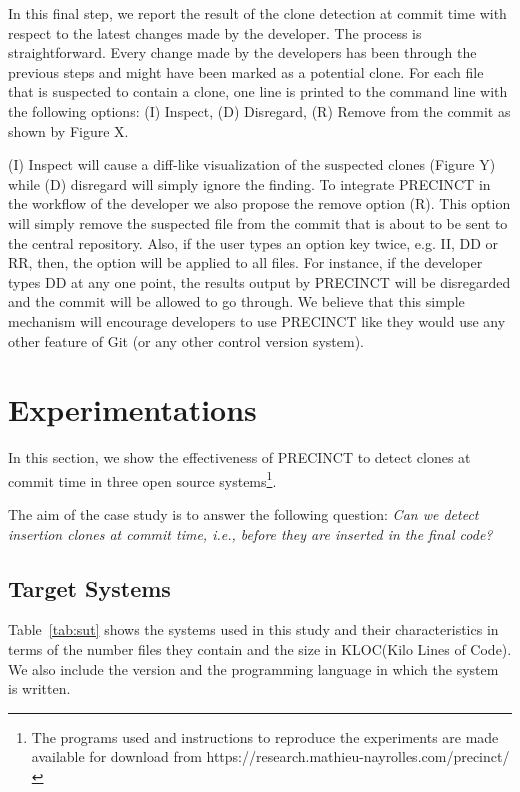 \documentclass[conference]{IEEEtran}
\begin{document}
In this final step, we report the result of the clone detection at commit time with respect to the latest changes made by the developer. The process is straightforward. Every change made by the developers has been through the previous steps and might have been marked as a potential clone. For each file that is suspected to contain a clone, one line is printed to the command line with the following options: (I) Inspect, (D) Disregard, (R) Remove from the commit as shown by Figure X.

(I) Inspect will cause a diff-like visualization of the suspected clones (Figure Y) while (D) disregard will simply ignore the finding.
To integrate PRECINCT in the workflow of the developer we also propose the  remove option (R). This option will simply remove the suspected file from the commit that is about to be sent to the central repository.
Also, if the user types an option key twice, e.g. II, DD or RR, then, the option will be applied to all files.
For instance, if the developer types DD at any one point, the results output by PRECINCT will be disregarded and the commit will be allowed to go through. We believe that this simple mechanism will encourage developers to use PRECINCT like they would use any other feature of Git (or any other control version system).



\section{Experimentations}
\label{sec:Experimentations}

In this section, we show the effectiveness of PRECINCT to
detect clones at commit time in three open source systems\footnote{The programs used and instructions to reproduce the experiments are made available for download from https://research.mathieu-nayrolles.com/precinct/}.

The aim of the case study is to answer the following question: \textit{Can we detect insertion clones at commit time, i.e., before they are inserted in the final code?}

\subsection{Target Systems}
\label{sub:Target Systems}

Table~\ref{tab:sut} shows the systems used in this study and their characteristics in terms of the number files they contain and the size in KLOC(Kilo Lines of Code). We also include the version and the programming language in which the system is written.
\end{document}
